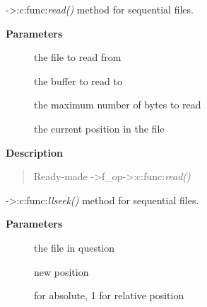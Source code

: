 \documentclass[a4paper,8pt,english]{sphinxmanual}
\begin{document}
\begin{fulllineitems}
\label{filesystems/index:c.seq_read}
-\textgreater{}:c:func:\emph{read()} method for sequential files.

\end{fulllineitems}


\textbf{Parameters}
\begin{description}
\item[{}] \leavevmode
the file to read from

\item[{}] \leavevmode
the buffer to read to

\item[{}] \leavevmode
the maximum number of bytes to read

\item[{}] \leavevmode
the current position in the file

\end{description}

\textbf{Description}
\begin{quote}

Ready-made -\textgreater{}f\_op-\textgreater{}:c:func:\emph{read()}
\end{quote}

\begin{fulllineitems}
\label{filesystems/index:c.seq_lseek}
-\textgreater{}:c:func:\emph{llseek()} method for sequential files.

\end{fulllineitems}


\textbf{Parameters}
\begin{description}
\item[{}] \leavevmode
the file in question

\item[{}] \leavevmode
new position

\item[{}]  for absolute, 1 for relative position

\end{description}
\end{document}
